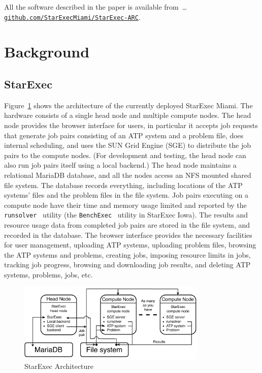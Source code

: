 \documentclass{easychair}
\begin{document}
\vspace*{1em}
\noindent
All the software described in the paper is available from~\ldots \\
\hspace*{1cm}\href{https://github.com/StarExecMiami/StarExec-ARC}{\tt github.com/StarExecMiami/StarExec-ARC}.

\section{Background}
\label{Background}

\subsection{StarExec}
\label{StarExec}

Figure~\ref{ArchitectureS} shows the architecture of the currently deployed StarExec Miami.
The hardware consists of a single head node and multiple compute nodes.
The head node provides the browser interface for users, in particular it accepts job requests
that generate job pairs consisting of an ATP system and a problem file, does internal scheduling,
and uses the SUN Grid Engine (SGE) to distribute the job pairs to the compute nodes.
(For development and testing, the head node can also run job pairs itself using a local backend.)
The head node maintains a relational MariaDB database, and all the nodes access an NFS mounted
shared file system.
The database records everything, including locations of the ATP systems' files and the problem 
files in the file system. 
Job pairs executing on a compute node have their time and memory usage limited and reported
by the {\tt runsolver}~\cite{Rou11} utility (the {\tt BenchExec}~\cite{BLW19} utility in 
StarExec Iowa).
The results and resource usage data from completed job pairs are stored in the file system, 
and recorded in the database.
The browser interface provides the necessary facilities for user management, uploading ATP 
systems, uploading problem
files, browsing the ATP systems and problems, creating jobs, imposing resource limits in jobs,
tracking job progress, browsing and downloading job results, and deleting ATP systems, problems, 
jobs, etc.

\begin{figure}[htb]
\begin{center}
\includegraphics[width=0.8\textwidth]{ArchitectureS}
\caption{StarExec Architecture}
\label{ArchitectureS}
\end{center}
\end{figure}
\end{document}
